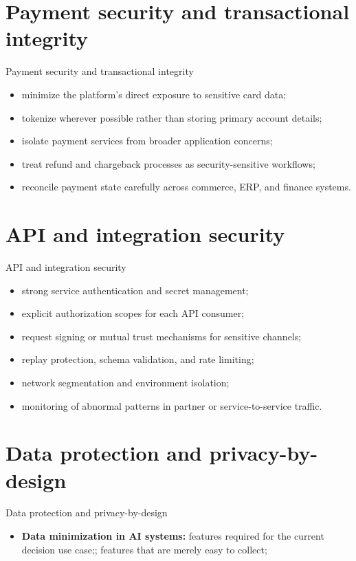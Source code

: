 \documentclass[aspectratio=169]{beamer}
\begin{document}
\section{Payment security and transactional integrity}

\begin{frame}{Payment security and transactional integrity}
  \begin{itemize}
    \item minimize the platform's direct exposure to sensitive card data;
    \item tokenize wherever possible rather than storing primary account details;
    \item isolate payment services from broader application concerns;
    \item treat refund and chargeback processes as security-sensitive workflows;
    \item reconcile payment state carefully across commerce, ERP, and finance systems.
  \end{itemize}
\end{frame}

\section{API and integration security}

\begin{frame}{API and integration security}
  \begin{itemize}
    \item strong service authentication and secret management;
    \item explicit authorization scopes for each API consumer;
    \item request signing or mutual trust mechanisms for sensitive channels;
    \item replay protection, schema validation, and rate limiting;
    \item network segmentation and environment isolation;
    \item monitoring of abnormal patterns in partner or service-to-service traffic.
  \end{itemize}
\end{frame}

\section{Data protection and privacy-by-design}

\begin{frame}{Data protection and privacy-by-design}
  \begin{itemize}
    \item \textbf{Data minimization in AI systems:} features required for the current decision use case;; features that are merely easy to collect;
  \end{itemize}
\end{frame}
\end{document}
